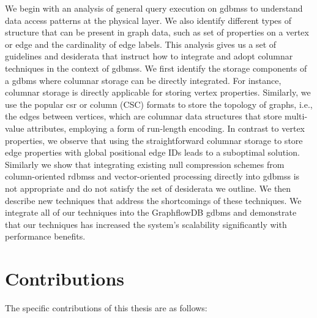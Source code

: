 We begin with an analysis of general query execution on \gls{gdbms}s to understand data access patterns at the physical layer. We also identify different types of structure that can be present in graph data, such as set of properties on a vertex or edge and the cardinality of edge labels. This analysis gives us a set of guidelines and desiderata that instruct how to integrate and adopt columnar techniques in the context of \gls{gdbms}s. We first identify the storage components of a \gls{gdbms} where columnar storage can be directly integrated. For instance, columnar storage is directly applicable for storing vertex properties. Similarly, we use the popular \gls{csr} or column (CSC) formats to store the topology of graphs, i.e., the edges between vertices, which are columnar data structures that store multi-value attributes, employing a form of run-length encoding. In contrast to vertex properties, we observe that using the straightforward columnar storage to store edge properties with global positional edge IDs leads to a suboptimal solution. Similarly we show that integrating existing null compression schemes from column-oriented \gls{rdbms}s and vector-oriented processing directly into \gls{gdbms}s is not appropriate and do not satisfy the set of desiderata we outline. We then describe new techniques that address the shortcomings of these techniques. We integrate all of our techniques into the GraphflowDB \gls{gdbms} and demonstrate that our techniques has increased the system's scalability significantly with performance benefits.

\section{Contributions}

The specific contributions of this thesis are as follows:

